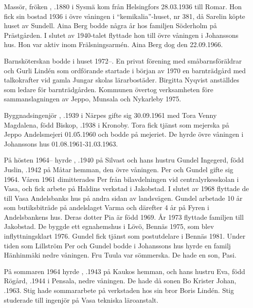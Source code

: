 Massör, fröken , .1880 i Sysmä kom från Helsingfors 28.03.1936 till Romar. Hon fick sin bostad 1936 i övre våningen i ``kemikalia''-huset, nr 381, då Sarelin köpte huset av Sundell. Aina Berg bodde några år hos familjen Söderholm på Prästgården. I slutet av 1940-talet flyttade hon till övre våningen i Johanssons hus. Hon var aktiv inom Frälsningsarmén. Aina Berg dog den 22.09.1966.

Barnsköterskan  bodde i huset 1972--. En privat förening med småbarnsföräldrar och Gurli Lindén som ordförande startade i början av 1970 en barnträdgård med talkokrafter vid gamla Jungar skolas lärarbostäder. Birgitta Nyqvist anställdes som ledare för barnträdgården. Kommunen övertog verksamheten före sammanslagningen av Jeppo, Munsala och Nykarleby 1975.

Byggnadsingenjör , .1939 i Närpes gifte sig 30.09.1961 med Tora Venny Magdalena, född Biskop, .1938 i Kronoby. Tora fick tjänst som mejerska på Jeppo Andelsmejeri 01.05.1960 och bodde på mejeriet. De hyrde övre våningen i Johanssons hus 01.08.1961-31.03.1963.

På hösten 1964-- hyrde , .1940 på Silvast och hans hustru Gundel Ingegerd, född Juslin, .1942 på Måtar hemman, den övre våningen. Per och Gundel gifte sig 1964. Våren 1961 dimitterades Per från bilavdelningen vid centralyrkesskolan i Vasa, och fick arbete på Haldins verkstad i Jakobstad. I slutet av 1968 flyttade de till Vasa Andelsbanks hus på andra sidan av landsvägen. Gundel arbetade 10 år som butiksbiträde på andelslaget Varma och därefter 4 år på Fyren i Andelsbankens hus. Deras dotter Pia är född 1969.  År 1973 flyttade familjen till Jakobstad. De byggde ett egnahemshus i Lövö, Bennäs 1975, som blev inflyttningsklart 1976. Gundel fick tjänst som postutdelare i Bennäs 1981. Under tiden som Lillström Per och Gundel bodde i Johanssons hus hyrde en familj Hänhinmäki nedre våningen. Fru Tuula var sömmerska. De hade en son, Pasi.

På sommaren 1964 hyrde , .1943 på Kaukos hemman, och hans hustru Eva, född Rögård, .1944 i Pensala, nedre våningen. De hade då sonen Bo Krister Johan, .1963. Stig hade sommararbete på verkstaden hos sin bror Boris Lindén. Stig studerade till ingenjör på Vasa tekniska läroanstalt.

